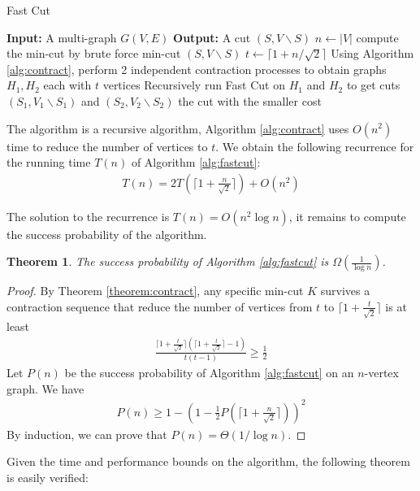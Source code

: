 \documentclass[11pt]{article}
\theoremstyle{plain}
\newtheorem{theorem}{Theorem}[section]
\begin{document}
\begin{algorithm}
\caption{Fast Cut}
\label{alg:fastcut}
\begin{algorithmic}
    \STATE \textbf{Input:} A multi-graph $G(V,E)$
    \STATE \textbf{Output:} A cut $(S,V\backslash S)$
    \STATE $n\leftarrow |V|$
    \STATE compute the min-cut by brute force
    \RETURN min-cut $(S,V\backslash S)$
    \ELSE
    \STATE $t\leftarrow \lceil 1+n/\sqrt{2}\rceil$
    \STATE Using Algorithm \ref{alg:contract}, perform 2 independent contraction processes to obtain graphs $H_1,H_2$ each with $t$ vertices
    \STATE Recursively run Fast Cut on $H_1$ and $H_2$ to get cuts $(S_1,V_1\backslash S_1)$ and $(S_2,V_2\backslash S_2)$
    \RETURN the cut with the smaller cost
    \ENDIF
\end{algorithmic}
\end{algorithm}

The algorithm is a recursive algorithm, Algorithm \ref{alg:contract} uses $O(n^2)$ time to reduce the number of vertices to $t$. We obtain the following recurrence for the running time $T(n)$ of Algorithm \ref{alg:fastcut}:
\begin{align*}
    T(n)=2T\left(\lceil 1+\frac{n}{\sqrt{2}}\rceil\right)+O(n^2)
\end{align*}

The solution to the recurrence is $T(n)=O(n^2\log n)$, it remains to compute the success probability of the algorithm. 

\begin{theorem}
    The success probability of Algorithm \ref{alg:fastcut} is $\Omega(\frac{1}{\log n})$.
\end{theorem}
\begin{proof}
    By Theorem \ref{theorem:contract}, any specific min-cut $K$ survives a contraction sequence that reduce the number of vertices from $t$ to $\lceil 1+\frac{t}{\sqrt{2}}\rceil$ is at least
    \begin{align*}
        \frac{\lceil 1+\frac{t}{\sqrt{2}}\rceil(\lceil 1+\frac{t}{\sqrt{2}}\rceil-1)}{t(t-1)}\geq \frac{1}{2}
    \end{align*}
    Let $P(n)$ be the success probability of Algorithm \ref{alg:fastcut} on an $n$-vertex graph. We have
    \begin{align*}
        P(n)\geq 1-\left(1-\frac{1}{2}P\left(\lceil 1+\frac{n}{\sqrt{2}}\rceil\right)\right)^2
    \end{align*}
    By induction, we can prove that $P(n)=\Theta(1/\log n)$.
\end{proof}
Given the time and performance bounds on the algorithm, the following theorem is easily verified:
\end{document}
